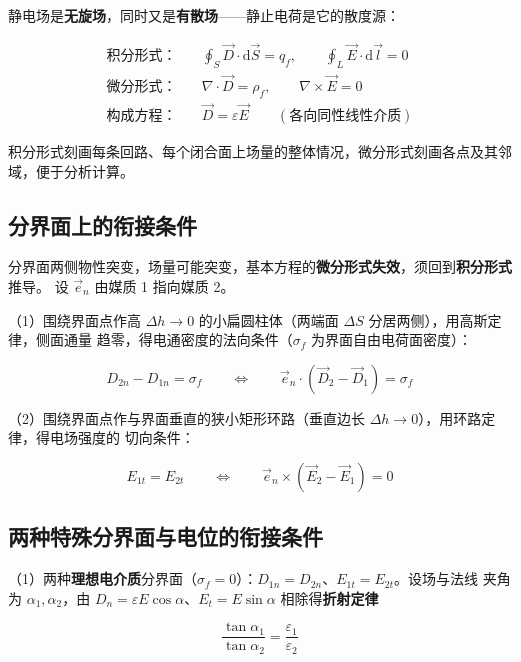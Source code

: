 静电场是\textbf{无旋场}，同时又是\textbf{有散场}——静止电荷是它的散度源：
\begin{formulaBox}
\[
\begin{aligned}
\text{积分形式：}\quad &\oint_S\vec{D}\cdot\mathrm{d}\vec{S}=q_f,
\qquad \oint_L\vec{E}\cdot\mathrm{d}\vec{l}=0\\
\text{微分形式：}\quad &\nabla\cdot\vec{D}=\rho_f,
\qquad \nabla\times\vec{E}=0\\
\text{构成方程：}\quad &\vec{D}=\varepsilon\vec{E}
\qquad(\text{各向同性线性介质})
\end{aligned}
\]
\end{formulaBox}

积分形式刻画每条回路、每个闭合面上场量的整体情况，微分形式刻画各点及其邻域，便于分析计算。

\subsection{分界面上的衔接条件}

分界面两侧物性突变，场量可能突变，基本方程的\textbf{微分形式失效}，须回到\textbf{积分形式}推导。
设 $\vec{e}_n$ 由媒质 1 指向媒质 2。

（1）围绕界面点作高 $\Delta h\to0$ 的小扁圆柱体（两端面 $\Delta S$ 分居两侧），用高斯定律，侧面通量
趋零，得电通密度的法向条件（$\sigma_f$ 为界面自由电荷面密度）：
\begin{formulaBox}
\[
D_{2n}-D_{1n}=\sigma_f
\qquad\Longleftrightarrow\qquad
\vec{e}_n\cdot\left(\vec{D}_2-\vec{D}_1\right)=\sigma_f
\]
\end{formulaBox}

（2）围绕界面点作与界面垂直的狭小矩形环路（垂直边长 $\Delta h\to0$），用环路定律，得电场强度的
切向条件：
\begin{formulaBox}
\[
E_{1t}=E_{2t}
\qquad\Longleftrightarrow\qquad
\vec{e}_n\times\left(\vec{E}_2-\vec{E}_1\right)=0
\]
\end{formulaBox}

\subsection{两种特殊分界面与电位的衔接条件}

（1）两种\textbf{理想电介质}分界面（$\sigma_f=0$）：$D_{1n}=D_{2n}$、$E_{1t}=E_{2t}$。设场与法线
夹角为 $\alpha_1,\alpha_2$，由 $D_n=\varepsilon E\cos\alpha$、$E_t=E\sin\alpha$ 相除得\textbf{折射定律}
\begin{formulaBox}
\[
\frac{\tan\alpha_1}{\tan\alpha_2}=\frac{\varepsilon_1}{\varepsilon_2}
\]
\end{formulaBox}

